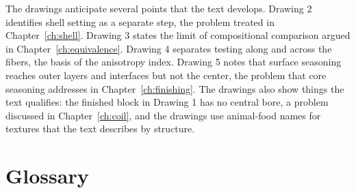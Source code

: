 \documentclass[11pt,openany]{book}
\theoremstyle{definition}
\begin{document}

The drawings anticipate several points that the text develops. Drawing 2 identifies shell setting as a separate step, the problem treated in Chapter~\ref{ch:shell}. Drawing 3 states the limit of compositional comparison argued in Chapter~\ref{ch:equivalence}. Drawing 4 separates testing along and across the fibers, the basis of the anisotropy index. Drawing 5 notes that surface seasoning reaches outer layers and interfaces but not the center, the problem that core seasoning addresses in Chapter~\ref{ch:finishing}. The drawings also show things the text qualifies: the finished block in Drawing 1 has no central bore, a problem discussed in Chapter~\ref{ch:coil}, and the drawings use animal-food names for textures that the text describes by structure.

\chapter{Glossary}\label{app:glossary}
\end{document}
